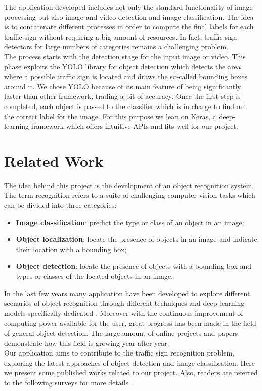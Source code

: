 \documentclass[10pt,twocolumn,letterpaper]{article}
\begin{document}
The application developed includes not only the standard functionality of image processing but also image and video detection and image classification. The idea is to concatenate different processes in order to compute the final labels for each traffic-sign without requiring a big amount of resources. In fact, traffic-sign detectors for large numbers of categories remains a challenging problem.\\ The process starts with the detection stage for the input image or video. This phase exploits the YOLO \cite{yolo} library for object detection which detects the area where a possible traffic sign is located and draws the so-called bounding boxes around it. We chose YOLO because of its main feature of being significantly faster than other framework, trading a bit of accuracy. Once the first step is completed, each object is passed to the classifier which is in charge to find out the correct label for the image. For this purpose we lean on Keras, a deep-learning framework which offers intuitive APIs and fits well for our project.  
\section{Related Work}
The idea behind this project is the development of an object recognition system. The term recognition refers to a suite of challenging computer vision tasks which can be divided into three categories:
\begin{itemize}[noitemsep,topsep=0pt]
	\item\textbf{Image classification}: predict the type or class of an object in an image;
	\item\textbf{Object localization}: locate the presence of objects in an image and indicate their location with a bounding box;
	\item\textbf{Object detection}: locate the presence of objects with a bounding box and types or classes of the located objects in an image.
\end{itemize}
In the last few years many application have been developed to explore different scenarios of object recognition through different techniques and deep learning models specifically dedicated \cite{wangMethods, tsrWithCnn, tsrWithCnn2}. Moreover with the continuous improvement of computing power available for the user, great progress has been made in the field of general object detection. The large amount of online projects and papers demonstrate how this field is growing year after year.\\
Our application aims to contribute to the traffic sign recognition problem, exploring the latest approaches of object detection and image classification. Here we present some published works related to our project. Also, readers are referred to the following surveys for more details \cite{tsr20}.
\end{document}
